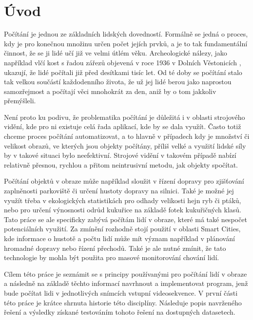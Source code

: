 \chapter{Úvod}
\label{sec:Introduction}
Počítání je jednou ze základních lidských dovedností. Formálně se jedná o proces, kdy je pro konečnou množinu určen počet jejích prvků, a je to tak fundamentální činnost, že se ji lidé učí již ve velmi útlém věku.
Archeologické nálezy, jako například vlčí kost s řadou zářezů objevená v roce 1936 v Dolních Věstonicích \cite{vestonice}, ukazují, že lidé počítali již před desítkami tisíc let.
Od té doby se počítání stalo tak velkou součástí každodenního života, že už jej lidé berou jako naprostou samozřejmost a počítají věci mnohokrát za den, aniž by o tom jakkoliv přemýšleli.

Není proto ku podivu, že problematika počítání je důležitá i v oblasti strojového vidění, kde pro ni existuje celá řada aplikací, kde by se dala využít.
Často totiž chceme proces počítání automatizovat, a to hlavně v případech kdy je množství či velikost obrazů, ve kterých jsou objekty počítány, příliš velké a využití lidské síly by v takové situaci bylo neefektivní.
Strojové vidění v takovém případě nabízí relativně přesnou, rychlou a přitom neintrusivní metodu, jak objekty spočítat.

Počítání objektů v obraze může například sloužit v řízení dopravy pro zjišťování zaplněnosti parkoviště \cite{parking_lot} či určení hustoty dopravy na silnici. Také je možné jej využít třeba v ekologických statistikách pro odhady velikosti hejn ryb či ptáků, nebo pro určení výnosnosti odrůd kukuřice na základě fotek kukuřičných klasů. \cite{DeepCorn}
Tato práce se ale specificky zabývá počítám lidí v obraze, které má také nespočet potenciálních využití.
Za zmínění rozhodně stojí použití v oblasti Smart Cities, kde informace o hustotě a počtu lidí může mít význam například v plánování hromadné dopravy nebo řízení přechodů.
Také je ale nutné zmínit, že tato technologie by mohla být použita pro masové monitorování chování lidí.

Cílem této práce je seznámit se s principy používanými pro počítání lidí v obraze a následně na základě těchto informací navrhnout a implementovat program, jenž bude počítat lidi v jednotlivých snímcích vstupní videosekvence.
V první části této práce je krátce shrnuta historie této disciplíny. Následuje popis navrženého řešení a  výsledky získané testováním tohoto řešení na dostupných datasetech.


\endinput